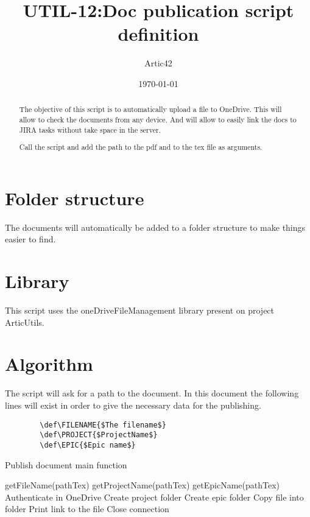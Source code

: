 \def\MYTITLE{UTIL-12:Doc publication script definition}
\def\MYNAME{Artic42}


\usepackage{dirtree}


    \title{\MYTITLE}
    \author{\MYNAME}
    \date{\today}
    \maketitle
    \thispagestyle{firstPage}

    \begin{abstract}
        The objective of this script is to automatically upload a file to OneDrive. This will allow to check the documents from any device. And will allow to easily link the docs to JIRA tasks without take space in the server.

        Call the script and add the path to the pdf and to the tex file as arguments.
    \end{abstract}

    \section{Folder structure}
    The documents will automatically be added to a folder structure to make things easier to find.
    \vspace{12pt}
    \renewcommand{\baselinestretch}{1.3}
    \renewcommand{\baselinestretch}{1}
    \section{Library}
    This script uses the oneDriveFileManagement library present on project ArticUtils.
    \section{Algorithm}
    The script will ask for a path to the document. In this document the following lines will exist in order to give the necessary data for the publishing.
    \begin{verbatim}
        \def\FILENAME{$The filename$}
        \def\PROJECT{$ProjectName$}
        \def\EPIC{$Epic name$}
    \end{verbatim}
    \begin{algorithm}[h!]
        \caption{Publish document main function}
    \begin{algorithmic}
        \State getFileName(pathTex)
        \State getProjectName(pathTex)
        \State getEpicName(pathTex)
        \State Authenticate in OneDrive
            \State Create project folder
        \EndIf
            \State Create epic folder
        \EndIf
        \State Copy file into folder
        \State Print link to the file
        \State Close connection
        \EndFunction
    \end{algorithmic}
    \end{algorithm}

